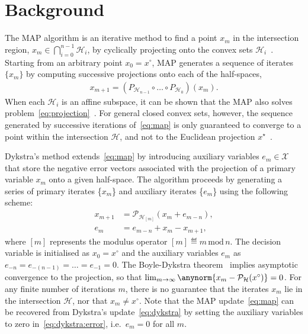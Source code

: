 \section{Background} \label{sec:background}

The MAP algorithm is an iterative method to find a point $x_m$ in the intersection region, $x_m  \in\bigcap_{i=0}^{n-1}\mathcal{H}_i$, by cyclically projecting onto the convex sets $\mathcal{H}_i$~\cite{NEUMANN,BREGMAN1965}. Starting from an arbitrary point $x_0=x^\circ$, MAP generates a sequence of iterates $\{x_m\}$ by computing successive projections onto each of the half-spaces,
\begin{align}\label{eq:map}
    x_{m+1} = (P_{\mathcal{H}_{n-1}} \circ \dots \circ P_{\mathcal{H}_0}) (x_m).
\end{align}
When each $\mathcal{H}_i$ is an affine subspace, it can be shown that the MAP also solves problem~\eqref{eq:projection}~\cite{NEUMANN}. For general closed convex sets, however, the sequence generated by successive iterations of~\eqref{eq:map} is only guaranteed to converge to a point within the intersection $\mathcal{H}$, and not to the Euclidean projection $x^\star$~\cite{BREGMAN1965}.

Dykstra's method extends~\eqref{eq:map} by introducing auxiliary variables $e_m \in \mathcal{X}$ that store the negative error vectors associated with the projection of a primary variable $x_m$ onto a given half-space. The algorithm proceeds by generating a series of primary iterates \{$x_{m}$\} and auxiliary iterates \{$e_{m}$\} using the following scheme:
\begin{subequations}\label{eq:dykstra}
\begin{align}
x_{m+1}&=\mathcal{P}_{\mathcal{H}_{[m]}}\left(x_{m}+e_{m-n}\right),\label{eq:dykstra:proj}\\
e_m&=e_{m-n}+x_{m}-x_{m+1}\label{eq:dykstra:error},
\end{align}
\end{subequations}
where $[m]$ represents the modulus operator $[m]\eqdef m \, \text{mod} \, n$. The decision variable is initialised as $x_0=x^\circ$ and the auxiliary variables $e_m$ as $e_{-n} = e_{-(n-1)} = \dots = e_{-1} = 0$.
The Boyle-Dykstra theorem~\cite{DYKSTRA,DYKSTRAPERKINS} implies asymptotic convergence to the projection, so that $\lim_{m\rightarrow\infty}\anynorm{x_m-\mathcal{P}_\mathcal{H}(x^\circ)}=0$. For any finite number of iterations $m$, there is no guarantee that the iterates $x_m$ lie in the intersection $\mathcal{H}$, nor that $x_m\neq x^\circ$. Note that the MAP update~\eqref{eq:map} can be recovered from Dykstra's update~\eqref{eq:dykstra} by setting the auxiliary variables to zero in~\eqref{eq:dykstra:error}, i.e.\ $e_m=0$ for all $m$.

